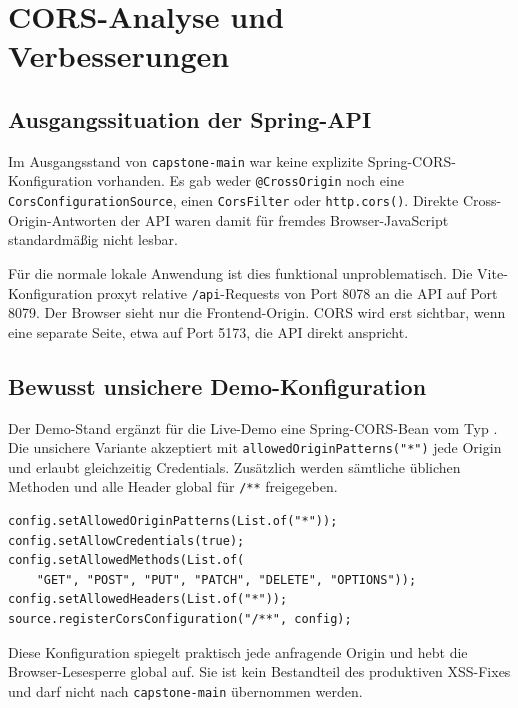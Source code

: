 \section{CORS-Analyse und Verbesserungen}
\label{sec:cors}

\subsection{Ausgangssituation der Spring-API}

Im Ausgangsstand von \texttt{capstone-main} war keine explizite
Spring-CORS-Konfiguration vorhanden. Es gab weder
\texttt{@CrossOrigin} noch eine \texttt{CorsConfigurationSource},
einen \texttt{CorsFilter} oder \texttt{http.cors()}. Direkte
Cross-Origin-Antworten der API waren damit für fremdes
Browser-JavaScript standardmäßig nicht lesbar.

Für die normale lokale Anwendung ist dies funktional unproblematisch.
Die Vite-Konfiguration proxyt relative \texttt{/api}-Requests von
Port 8078 an die API auf Port 8079. Der Browser sieht nur die
Frontend-Origin. CORS wird erst sichtbar, wenn eine separate Seite,
etwa auf Port 5173, die API direkt anspricht.

\subsection{Bewusst unsichere Demo-Konfiguration}

Der Demo-Stand  ergänzt für
die Live-Demo eine Spring-CORS-Bean vom Typ
. Die unsichere Variante akzeptiert mit
\texttt{allowedOriginPatterns("*")} jede Origin und erlaubt
gleichzeitig Credentials. Zusätzlich werden sämtliche üblichen
Methoden und alle Header global für \texttt{/**} freigegeben.

\begin{lstlisting}[caption={Bewusst unsichere CORS-Demo, nicht für Produktion}]
config.setAllowedOriginPatterns(List.of("*"));
config.setAllowCredentials(true);
config.setAllowedMethods(List.of(
    "GET", "POST", "PUT", "PATCH", "DELETE", "OPTIONS"));
config.setAllowedHeaders(List.of("*"));
source.registerCorsConfiguration("/**", config);
\end{lstlisting}

Diese Konfiguration spiegelt praktisch jede anfragende Origin und
hebt die Browser-Lesesperre global auf. Sie ist kein Bestandteil des
produktiven XSS-Fixes und darf nicht nach \texttt{capstone-main}
übernommen werden.

